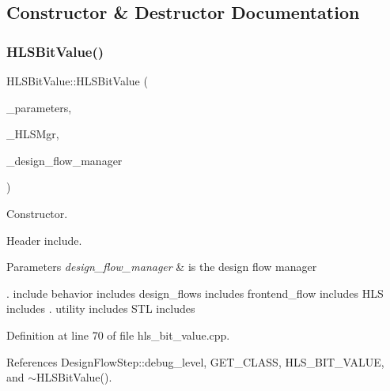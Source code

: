 \subsection{Constructor \& Destructor Documentation}
\mbox{\label{classHLSBitValue_a0953a769ebaf47a3961793524a3ad928}} 
\subsubsection{\texorpdfstring{H\+L\+S\+Bit\+Value()}{HLSBitValue()}}
{\footnotesize\ttfamily H\+L\+S\+Bit\+Value\+::\+H\+L\+S\+Bit\+Value (\begin{DoxyParamCaption}\item[{const \hyperlink{Parameter_8hpp_a37841774a6fcb479b597fdf8955eb4ea}{Parameter\+Const\+Ref}}]{\+\_\+parameters,  }\item[{const \hyperlink{hls__manager_8hpp_acd3842b8589fe52c08fc0b2fcc813bfe}{H\+L\+S\+\_\+manager\+Ref}}]{\+\_\+\+H\+L\+S\+Mgr,  }\item[{const Design\+Flow\+Manager\+Const\+Ref}]{\+\_\+design\+\_\+flow\+\_\+manager }\end{DoxyParamCaption})}



Constructor. 

Header include.


\begin{DoxyParams}{Parameters}
{\em design\+\_\+flow\+\_\+manager} & is the design flow manager\\
\hline
\end{DoxyParams}
. include behavior includes design\+\_\+flows includes frontend\+\_\+flow includes H\+LS includes . utility includes S\+TL includes 

Definition at line 70 of file hls\+\_\+bit\+\_\+value.\+cpp.



References Design\+Flow\+Step\+::debug\+\_\+level, G\+E\+T\+\_\+\+C\+L\+A\+SS, H\+L\+S\+\_\+\+B\+I\+T\+\_\+\+V\+A\+L\+UE, and $\sim$\+H\+L\+S\+Bit\+Value().


